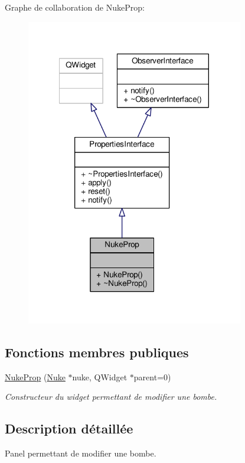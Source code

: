 Graphe de collaboration de Nuke\+Prop\+:
\nopagebreak
\begin{figure}[H]
\begin{center}
\leavevmode
\includegraphics[width=269pt]{d0/db8/classNukeProp__coll__graph}
\end{center}
\end{figure}
\subsection*{Fonctions membres publiques}
\begin{DoxyCompactItemize}
\item 
\hyperlink{classNukeProp_a2e11beb43353c8ccbdfe1d8ba7eb61a6}{Nuke\+Prop} (\hyperlink{classNuke}{Nuke} $\ast$nuke, Q\+Widget $\ast$parent=0)
\begin{DoxyCompactList}\small\item\em Constructeur du widget permettant de modifier une bombe. \end{DoxyCompactList}\end{DoxyCompactItemize}


\subsection{Description détaillée}
Panel permettant de modifier une bombe. 

